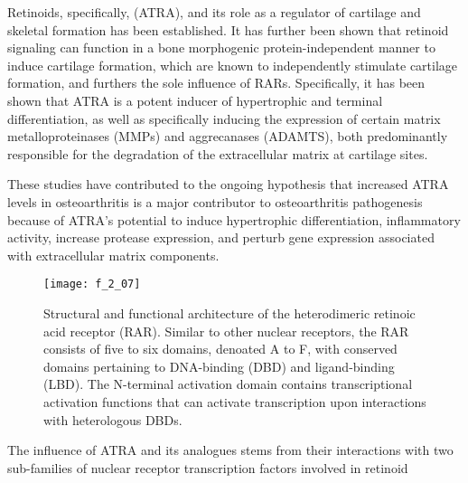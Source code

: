 \begin{refsection}
Retinoids, specifically,  (ATRA), and its role
as a regulator of cartilage and skeletal formation has been
established.\cite{Koyama1999} It has further been shown that retinoid signaling
can function in a bone morphogenic protein-independent manner to induce cartilage formation, which
are known to independently stimulate cartilage formation, and furthers the sole
influence of RARs.\cite{Weston2000} Specifically, it has been shown that ATRA is
a potent inducer of hypertrophic and terminal differentiation, as well as
specifically inducing the expression of certain matrix metalloproteinases (MMPs)
and aggrecanases (ADAMTS), both predominantly responsible for the degradation of
the extracellular matrix at cartilage
sites.\cite{Wang2002,Iwamoto1994,Koyama1999,Johnson2003}

These studies have contributed to the ongoing hypothesis that increased ATRA
levels in osteoarthritis is a major contributor to osteoarthritis pathogenesis
because of ATRA's potential to induce hypertrophic differentiation, inflammatory
activity, increase protease expression, and perturb gene expression associated
with extracellular matrix components. 
\begin{figure}[h!] \centering \texttt{[image: f\_2\_07]}
    \caption[Structural and functional architecture of the heterodimeric
        retinoic acid receptor (RAR). Similar to other nuclear receptors, the
        RAR consists of five to six domains, denoated A to F, with conserved
        domains pertaining to DNA-binding (DBD) and ligand-binding (LBD).  The
        N-terminal activation domain contains transcriptional activation
        functions that can activate transcription upon interactions with
        heterologous DBDs.]
        {Structural and functional architecture of the heterodimeric
        retinoic acid receptor (RAR). Similar to other nuclear receptors, the
        RAR consists of five to six domains, denoated A to F, with conserved
        domains pertaining to DNA-binding (DBD) and ligand-binding (LBD).  The
        N-terminal activation domain contains transcriptional activation
        functions that can activate transcription upon interactions with
        heterologous
        DBDs.\cite{DeLera2007}}\label{fig:retinoid_receptor_structures}
    \end{figure}
The influence of ATRA and its analogues stems from their interactions with two
sub-families of nuclear receptor transcription factors involved in retinoid

\end{refsection}

